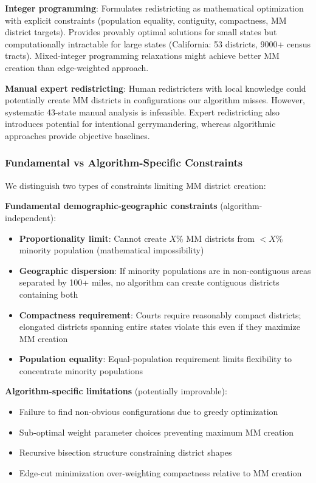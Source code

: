 \textbf{Integer programming}: Formulates redistricting as mathematical optimization with explicit constraints (population equality, contiguity, compactness, MM district targets). Provides provably optimal solutions for small states but computationally intractable for large states (California: 53 districts, 9000+ census tracts). Mixed-integer programming relaxations might achieve better MM creation than edge-weighted approach.

\textbf{Manual expert redistricting}: Human redistricters with local knowledge could potentially create MM districts in configurations our algorithm misses. However, systematic 43-state manual analysis is infeasible. Expert redistricting also introduces potential for intentional gerrymandering, whereas algorithmic approaches provide objective baselines.

\subsubsection{Fundamental vs Algorithm-Specific Constraints}

We distinguish two types of constraints limiting MM district creation:

\textbf{Fundamental demographic-geographic constraints} (algorithm-independent):
\begin{itemize}
    \item \textbf{Proportionality limit}: Cannot create $X$\% MM districts from $<X$\% minority population (mathematical impossibility)
    \item \textbf{Geographic dispersion}: If minority populations are in non-contiguous areas separated by 100+ miles, no algorithm can create contiguous districts containing both
    \item \textbf{Compactness requirement}: Courts require reasonably compact districts; elongated districts spanning entire states violate this even if they maximize MM creation
    \item \textbf{Population equality}: Equal-population requirement limits flexibility to concentrate minority populations
\end{itemize}

\textbf{Algorithm-specific limitations} (potentially improvable):
\begin{itemize}
    \item Failure to find non-obvious configurations due to greedy optimization
    \item Sub-optimal weight parameter choices preventing maximum MM creation
    \item Recursive bisection structure constraining district shapes
    \item Edge-cut minimization over-weighting compactness relative to MM creation
\end{itemize}

